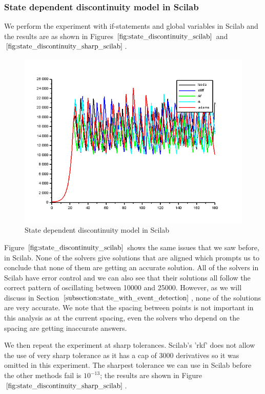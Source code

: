 \subsubsection{State dependent discontinuity model in Scilab}
We perform the experiment with if-statements and global variables in Scilab and the results are as shown in Figures $\ref{fig:state_discontinuity_scilab}$ and $\ref{fig:state_discontinuity_sharp_scilab}$.

\begin{figure}[h]
\centering
\includegraphics[width=0.7\linewidth]{./figures/state_discontinuity_scilab}
\caption{State dependent discontinuity model in Scilab}
\label{fig:state_discontinuity_scilab}
\end{figure}

Figure $\ref{fig:state_discontinuity_scilab}$ shows the same issues that we saw before, in Scilab. None of the solvers give solutions that are aligned which prompts us to conclude that none of them are getting an accurate solution. All of the solvers in Scilab have error control and we can also see that their solutions all follow the correct pattern of oscillating between 10000 and 25000. However, as we will discuss in Section $\ref{subsection:state_with_event_detection}$, none of the solutions are very accurate. We note that the spacing between points is not important in this analysis as at the current spacing, even the solvers who depend on the spacing are getting inaccurate answers.

We then repeat the experiment at sharp tolerances. Scilab's 'rkf' does not allow the use of very sharp tolerance as it has a cap of 3000 derivatives so it was omitted in this experiment. The sharpest tolerance we can use in Scilab before the other methods fail is $10^{-13}$; the results are shown in Figure $\ref{fig:state_discontinuity_sharp_scilab}$.

